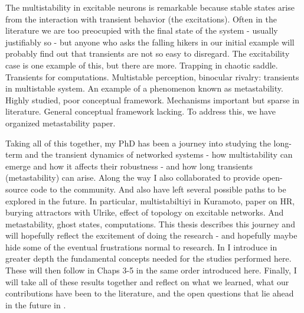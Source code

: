 The multistability in excitable neurons is remarkable because stable states arise from the interaction with transient behavior (the excitations). Often in the literature we are too preocupied with the final state of the system - usually justifiably so - but anyone who asks the falling hikers in our initial example will probably find out that transients are not so easy to disregard. The excitability case is one example of this, but there are more. Trapping in chaotic saddle. Transients for computations. Multistable perception, binocular rivalry: transients in multistable system. An example of a phenomenon known as metastability. Highly studied, poor conceptual framework. Mechanisms important but sparse in literature. General conceptual framework lacking. To address this, we have organized metastability paper. 


Taking all of this together, my PhD has been a journey into studying the long-term and the transient dynamics of networked systems - how multistability can emerge and how it affects their robustness - and how long transients (metastability) can arise. Along the way I also collaborated to provide open-source code to the community. And also have left several possible paths to be explored in the future. In particular, multistabiltiyi in Kuramoto, paper on HR, burying attractors with Ulrike, effect of topology on excitable networks. And metastability, ghost states, computations. This thesis describes this journey and will hopefully reflect the excitement of doing the research - and hopefully maybe hide some of the eventual frustrations normal to research. In  I introduce in greater depth the fundamental concepts needed for the studies performed here. These will then follow in Chaps 3-5 in the same order introduced here. Finally, I will take all of these results together and reflect on what we learned, what our contributions have been to the literature, and the open questions that lie ahead in the future in . 
